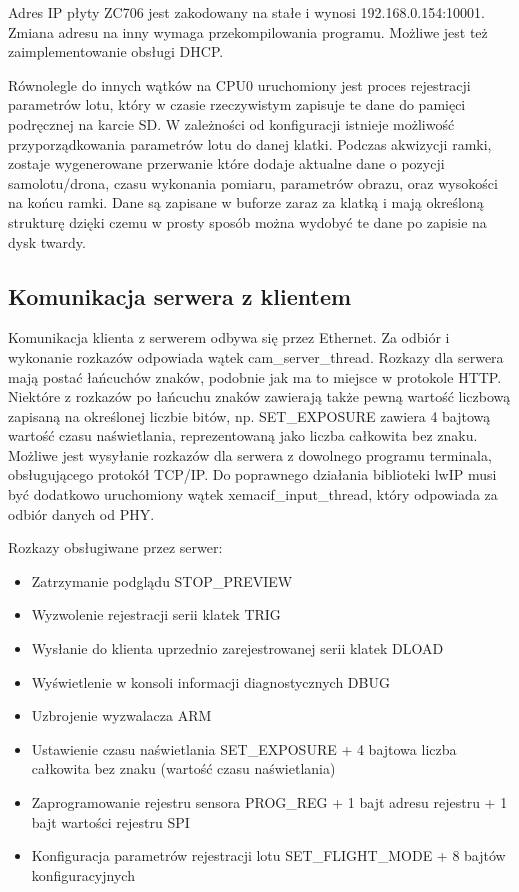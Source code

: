 \documentclass[a4paper,11pt,oneside]{report}  %
\begin{document}
Adres IP płyty ZC706 jest zakodowany na stałe i wynosi 192.168.0.154:10001. Zmiana adresu na inny wymaga przekompilowania programu. Możliwe jest też zaimplementowanie obsługi DHCP.

Równolegle do innych wątków na CPU0 uruchomiony jest proces rejestracji parametrów lotu, który w czasie rzeczywistym zapisuje te dane do pamięci podręcznej na karcie SD. W zależności od konfiguracji istnieje możliwość przyporządkowania parametrów lotu do danej klatki. Podczas akwizycji ramki, zostaje wygenerowane przerwanie które dodaje aktualne dane o pozycji samolotu/drona, czasu wykonania pomiaru, parametrów obrazu, oraz wysokości na końcu ramki. Dane są zapisane w buforze zaraz za klatką i mają określoną strukturę dzięki czemu w prosty sposób można wydobyć te dane po zapisie na dysk twardy. 

\subsection{Komunikacja serwera z klientem}
Komunikacja klienta z serwerem odbywa się przez Ethernet. Za odbiór i wykonanie rozkazów odpowiada wątek cam\_server\_thread. Rozkazy dla serwera mają postać łańcuchów znaków, podobnie jak ma to miejsce w protokole HTTP. Niektóre z rozkazów po łańcuchu znaków zawierają także pewną wartość liczbową zapisaną na określonej liczbie bitów, np. SET\_EXPOSURE zawiera 4 bajtową wartość czasu naświetlania, reprezentowaną jako liczba całkowita bez znaku. Możliwe jest wysyłanie rozkazów dla serwera z dowolnego programu terminala, obsługującego protokół TCP/IP. Do poprawnego działania biblioteki lwIP musi być dodatkowo uruchomiony wątek xemacif\_input\_thread, który odpowiada za odbiór danych od PHY.

Rozkazy obsługiwane przez serwer:

\begin{itemize}
\item Zatrzymanie podglądu STOP\_PREVIEW
\item Wyzwolenie rejestracji serii klatek 
TRIG
\item Wysłanie do klienta uprzednio zarejestrowanej serii klatek DLOAD
\item Wyświetlenie w konsoli informacji diagnostycznych DBUG
\item Uzbrojenie wyzwalacza ARM
\item Ustawienie czasu naświetlania SET\_EXPOSURE + 4 bajtowa liczba całkowita bez znaku (wartość czasu naświetlania)
\item Zaprogramowanie rejestru sensora PROG\_REG + 1 bajt adresu rejestru + 1 bajt wartości rejestru SPI
\item Konfiguracja parametrów rejestracji lotu SET\_FLIGHT\_MODE + 8 bajtów konfiguracyjnych
\end{itemize}
\end{document}
